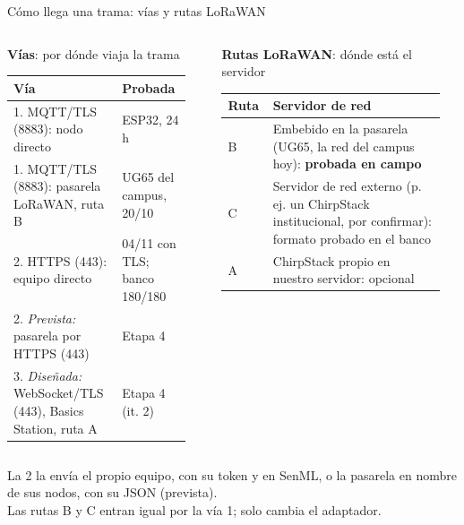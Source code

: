 \documentclass[aspectratio=169,11pt]{beamer}
\gdef\lafuente{}
\newcommand{\fuente}[1]{\gdef\lafuente{#1}}
\begin{document}
\begin{frame}{Cómo llega una trama: vías y rutas LoRaWAN}
  \begin{columns}[T,onlytextwidth]
    \begin{column}{0.49\textwidth}
      {\small\textbf{Vías}: por dónde viaja la trama}\par\smallskip
      \scriptsize
      \begin{tabular}{@{}L{0.55\linewidth}L{0.36\linewidth}@{}}
        \toprule
        Vía & Probada \\
        . MQTT/TLS (8883): nodo directo & ESP32, 24 h \\
        1. MQTT/TLS (8883): pasarela LoRaWAN, ruta B & UG65 del campus, 20/10 \\
        2. HTTPS (443): equipo directo & 04/11 con TLS; banco 180/180 \\
        2. \textit{Prevista:} pasarela por HTTPS (443) & Etapa 4 \\
        3. \textit{Diseñada:} WebSocket/TLS (443), Basics Station, ruta A & Etapa 4 (it. 2) \\
        \bottomrule
      \end{tabular}
    \end{column}
    \begin{column}{0.49\textwidth}
      {\small\textbf{Rutas LoRaWAN}: dónde está el servidor}\par\smallskip
      \scriptsize
      \begin{tabular}{@{}L{0.16\linewidth}L{0.76\linewidth}@{}}
        \toprule
        Ruta & Servidor de red \\
        \midrule
        B & Embebido en la pasarela (UG65, la red del campus hoy): \textbf{probada en campo} \\
        C & Servidor de red externo (p. ej. un ChirpStack institucional, por confirmar): formato probado en el banco \\
        A & ChirpStack propio en nuestro servidor: opcional \\
        \bottomrule
      \end{tabular}
    \end{column}
  \end{columns}
  \footnotesize La 2 la envía el propio equipo, con su token y en SenML, o la pasarela en nombre de sus nodos, con su JSON (prevista).\\
Las rutas B y C entran igual por la vía 1; solo cambia el adaptador.
  \fuente{docs/10 §1 (vías dibujadas y rutas); docs/16 §45, §49 y §53}
\end{frame}
\end{document}
